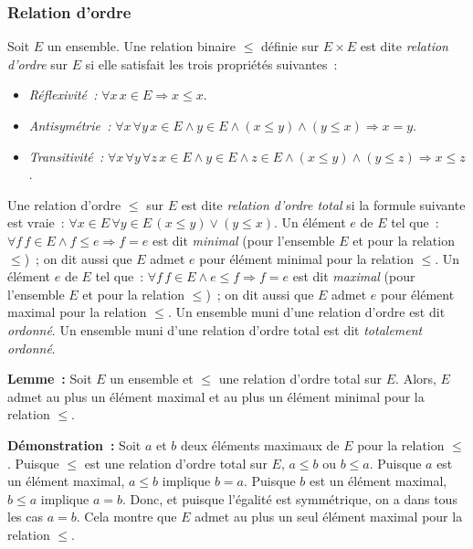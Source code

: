 \subsubsection{Relation d'ordre}

Soit $E$ un ensemble. 
Une relation binaire $\leq$ définie sur $E \times E$ est dite \textit{relation d'ordre} sur $E$ si elle satisfait les trois propriétés suivantes : 
\begin{itemize}[nosep]
    \item \textit{Réflexivité :} $\forall x \, x \in E \Rightarrow x \leq x$.
    \item \textit{Antisymétrie :} $\forall x \, \forall y \, x \in E \wedge y \in E \wedge (x \leq y) \wedge (y \leq x) \Rightarrow x = y$.
    \item \textit{Transitivité :} $\forall x \, \forall y \, \forall z \, x \in E \wedge y \in E \wedge z \in E \wedge (x \leq y) \mathrel{\wedge} (y \leq z) \Rightarrow x \leq z$.
\end{itemize}
Une relation d'ordre $\leq$ sur $E$ est dite \textit{relation d'ordre total} si la formule suivante est vraie : $\forall x \in E \, \forall y \in E \, (x \leq y) \vee (y \leq x)$.
Un élément $e$ de $E$ tel que : $\forall f \, f \in E \wedge f \leq e \Rightarrow f = e$ est dit \textit{minimal} (pour l'ensemble $E$ et pour la relation $\leq$) ; on dit aussi que $E$ admet $e$ pour élément minimal pour la relation $\leq$. 
Un élément $e$ de $E$ tel que : $\forall f \, f \in E \wedge e \leq f \Rightarrow f = e$ est dit \textit{maximal} (pour l'ensemble $E$ et pour la relation $\leq$) ; on dit aussi que $E$ admet $e$ pour élément maximal pour la relation $\leq$. 
Un ensemble muni d'une relation d'ordre est dit \textit{ordonné}.
Un ensemble muni d'une relation d'ordre total est dit \textit{totalement ordonné}.

\medskip

\noindent\textbf{Lemme :} Soit $E$ un ensemble et $\leq$ une relation d'ordre total sur $E$. 
    Alors, $E$ admet au plus un élément maximal et au plus un élément minimal pour la relation $\leq$. 

\medskip

\noindent\textbf{Démonstration :} 
    Soit $a$ et $b$ deux éléments maximaux de $E$ pour la relation $\leq$.
    Puisque $\leq$ est une relation d'ordre total sur $E$, $a \leq b$ ou $b \leq a$. 
    Puisque $a$ est un élément maximal, $a \leq b$ implique $b = a$.
    Puisque $b$ est un élément maximal, $b \leq a$ implique $a = b$.
    Donc, et puisque l'égalité est symmétrique, on a dans tous les cas $a = b$.
    Cela montre que $E$ admet au plus un seul élément maximal pour la relation $\leq$.
    
